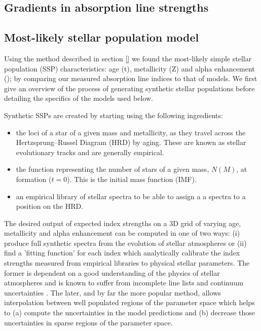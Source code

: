 	\subsection{Gradients in absorption line strengths}
		\label{subsec:absorptionGrad}


	\subsection{Most-likely stellar population model}
		\label{subsec:ssp}


		Using the method described in section \ref{} we found the most-likely simple stellar population (SSP) characteristics: age (t), metallicity (Z) and alpha enhancement (\textalpha); by comparing our measured absorption line indices to that of models. We first give an overview of the process of generating synthetic stellar populations before detailing the specifics of the models used below. 

		Synthetic SSPs are created by starting using the following ingredients:
		\begin{itemize}
			\item the loci of a star of a given mass and metallicity, as they travel across the Hertzsprung--Russel Diagram (HRD) by aging. These are known as stellar evolutionary tracks and are generally empirical.
			\item  the function representing the number of stars of a given mass, $N(M)$, at formation ($t = 0$). This is the initial mass function (IMF).
			\item an empirical library of stellar spectra to be able to assign a a spectra to a position on the HRD. 
		\end{itemize}
		The desired output of expected index strengths on a 3D grid of varying age, metallicity and alpha enhancement can be computed in one of two ways: (i) produce full synthetic spectra from the evolution of stellar atmospheres or (ii) find a 'fitting function' for each index which analytically calibrate the index strengths measured from empirical libraries to physical stellar parameters. The former is dependent on a good understanding of the physics of stellar atmospheres and is known to suffer from incomplete line lists and continuum uncertainties \citep{Thomas2004}. The later, and by far the more popular method, allows interpolation between well populated regions of the parameter space which helps to (a) compute the uncertainties in the model predictions and (b) decrease those uncertainties in sparse regions of the parameter space. 

